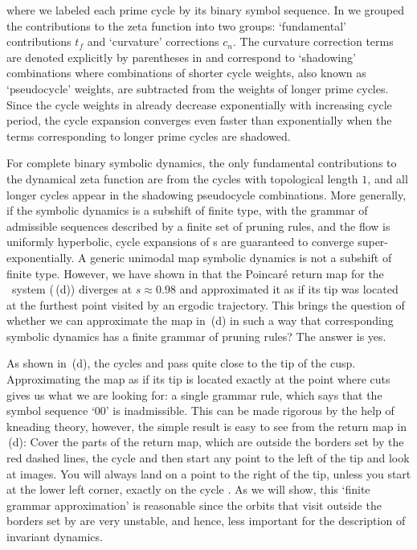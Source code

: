 \documentclass[aip,cha,
reprint,
secnumarabic,
nofootinbib, tightenlines,
nobibnotes, showkeys, showpacs,
superscriptaddress,
]{revtex4-1}
\begin{document}
{where we labeled each prime cycle by its binary symbol sequence. In
 we grouped the contributions to the zeta function
into two groups: `fundamental' contributions $t_f$ and `curvature' corrections $c_n$.
The curvature correction terms are denoted explicitly by parentheses in  and
correspond to `shadowing' combinations where combinations of
shorter cycle weights, also known as `pseudocycle' weights, are subtracted from the weights of longer
prime cycles. Since the cycle weights in  already
decrease exponentially with increasing cycle period, the cycle expansion
 converges even faster than exponentially when the
terms corresponding to longer prime cycles are shadowed.

For complete binary symbolic dynamics, the only fundamental contributions to
the dynamical zeta function are from the cycles with topological length $1$, and all
longer cycles appear in the shadowing pseudocycle combinations.
More generally, if the symbolic dynamics is a subshift of finite type,
with the grammar of admissible sequences described by a finite set of pruning rules,
and the flow is uniformly hyperbolic, cycle expansions of {\Fd s}
are guaranteed to converge super-exponentially.
A generic unimodal map symbolic dynamics is not a subshift of finite type.
However, we have shown in  that the Poincar\'e return map for
the \twomode\ system (\,(d)) diverges at
$s \approx 0.98$ and approximated it as if its tip was located at the
furthest point visited by an ergodic trajectory. This brings the question of
whether we can approximate the map in \,(d) in such a way
that corresponding symbolic dynamics has a finite grammar of pruning rules?
The answer is yes.

As shown in \,(d), the cycles 
and  pass quite close to the tip of the cusp. Approximating the
map as if its tip is located exactly at the point where  cuts gives us
what we are looking for: a single grammar rule, which says that the symbol
sequence `00' is inadmissible. This can be made rigorous by the help of
kneading theory, however, the simple result is easy to see from the return map
in \,(d): Cover the parts of the return map, which
are outside the borders set by the red dashed lines, the cycle  and
then start any point to the left of the tip and look at images. You will always
land on a point to the right of the tip, unless you start at the lower left
corner, exactly on the cycle . As we will show, this `finite grammar
approximation' is reasonable since the orbits that visit outside
the borders set by  are very unstable, and hence, less
important for the description of invariant dynamics.

}
\end{document}
